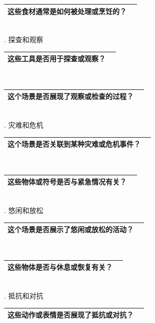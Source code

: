 \documentclass[12pt]{book}
\begin{document}
\begin{tabular}{|p{15cm}|p{3cm}|}
	\hline
这些食材通常是如何被处理或烹饪的？\\
	\hline
\end{tabular}\\


. 探查和观察

\begin{tabular}{|p{15cm}|p{3cm}|}
	\hline
这些工具是否用于探查或观察？\\
	\hline
\end{tabular}\\



\begin{tabular}{|p{15cm}|p{3cm}|}
	\hline
这个场景是否展现了观察或检查的过程？\\
	\hline
\end{tabular}\\


. 灾难和危机

\begin{tabular}{|p{15cm}|p{3cm}|}
	\hline
这个场景是否关联到某种灾难或危机事件？\\
	\hline
\end{tabular}\\




\begin{tabular}{|p{15cm}|p{3cm}|}
	\hline
这些物体或符号是否与紧急情况有关？\\
	\hline
\end{tabular}\\


. 悠闲和放松

\begin{tabular}{|p{15cm}|p{3cm}|}
	\hline
这个场景是否展示了悠闲或放松的活动？\\
	\hline
\end{tabular}\\



\begin{tabular}{|p{15cm}|p{3cm}|}
	\hline
这些物体是否与休息或恢复有关？\\
	\hline
\end{tabular}\\



. 抵抗和对抗

\begin{tabular}{|p{15cm}|p{3cm}|}
	\hline
这些动作或表情是否展现了抵抗或对抗？\\
	\hline
\end{tabular}\\
\end{document}
